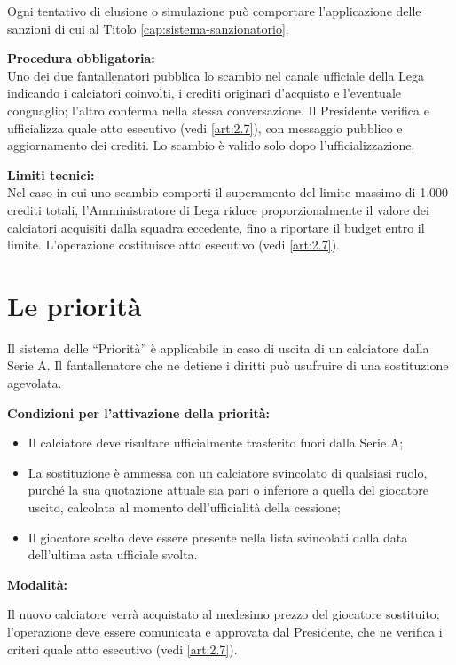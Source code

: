 Ogni tentativo di elusione o simulazione può comportare l'applicazione delle sanzioni di cui al Titolo \ref{cap:sistema-sanzionatorio}.

\textbf{Procedura obbligatoria:}\\
Uno dei due fantallenatori pubblica lo scambio nel canale ufficiale della Lega indicando i calciatori coinvolti, i crediti originari d'acquisto e l'eventuale conguaglio; l'altro conferma nella stessa conversazione. Il Presidente verifica e ufficializza quale atto esecutivo (vedi \ref{art:2.7}), con messaggio pubblico e aggiornamento dei crediti. Lo scambio è valido solo dopo l'ufficializzazione.

\textbf{Limiti tecnici:}\\
Nel caso in cui uno scambio comporti il superamento del limite massimo di 1.000 crediti totali, l'Amministratore di Lega riduce proporzionalmente il valore dei calciatori acquisiti dalla squadra eccedente, fino a riportare il budget entro il limite. L'operazione costituisce atto esecutivo (vedi \ref{art:2.7}).

\section{Le priorità}
\label{art:6.4}

Il sistema delle “Priorità” è applicabile in caso di uscita di un calciatore dalla Serie A. Il fantallenatore che ne detiene i diritti può usufruire di una sostituzione agevolata.

\textbf{Condizioni per l'attivazione della priorità:}
\begin{itemize}
\item Il calciatore deve risultare ufficialmente trasferito fuori dalla Serie A;
\item La sostituzione è ammessa con un calciatore svincolato di qualsiasi ruolo, purché la sua quotazione attuale sia pari o inferiore a quella del giocatore uscito, calcolata al momento dell'ufficialità della cessione;
\item Il giocatore scelto deve essere presente nella lista svincolati dalla data dell'ultima asta ufficiale svolta.
\end{itemize}

\textbf{Modalità:}

Il nuovo calciatore verrà acquistato al medesimo prezzo del giocatore sostituito; l'operazione deve essere comunicata e approvata dal Presidente, che ne verifica i criteri quale atto esecutivo (vedi \ref{art:2.7}).

